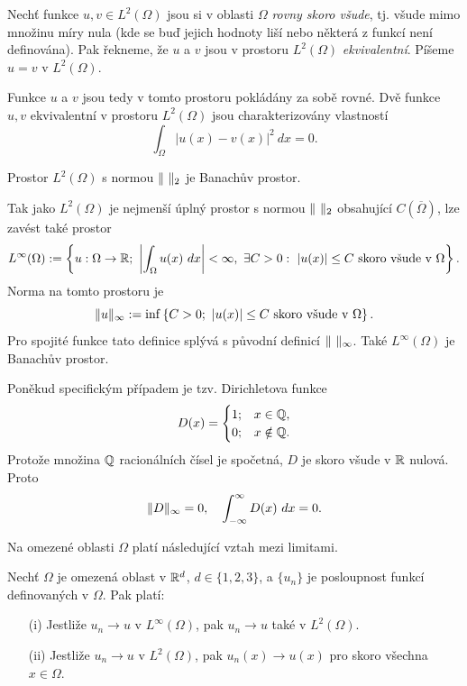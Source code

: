 \begin{df}
Nechť funkce $u,v\in L^2(\Omega)$ jsou si v oblasti $\Omega$ \emph{rovny skoro všude}, tj. všude mimo množinu míry nula (kde se buď jejich hodnoty liší nebo některá z funkcí není definována).
Pak řekneme, že $u$ a $v$ jsou v prostoru $L^2(\Omega)$ \emph{ekvivalentní}.
Píšeme $u=v$ v $L^2(\Omega)$.
\end{df}
Funkce $u$ a $v$ jsou tedy v tomto prostoru pokládány za sobě rovné.
Dvě funkce $u,v$ ekvivalentní v prostoru $L^2(\Omega)$ jsou charakterizovány vlastností
\[ \int_\Omega|u(x)-v(x)|^2~dx = 0. \]


\begin{veta}
Prostor $L^2(\Omega)$ s normou $\norm{\ }_2$ je Banachův prostor.
\end{veta}

Tak jako $L^2(\Omega)$ je nejmenší úplný prostor s normou $\norm{\ }_2$ obsahující $C(\overline\Omega)$, lze zavést také prostor
\[ L^\infty(\Omega):=\left\{u:\Omega\rightarrow\mathbb R;~\left|\int_\Omega u(x)~dx\right|<\infty, ~\exists C>0:~|u(x)|\le C \mbox{ skoro všude v }\Omega\right\}. \]
Norma na tomto prostoru je
\[ \|u\|_\infty := \inf\left\{C>0;~|u(x)|\le C \mbox{ skoro všude v }\Omega\right\}. \]
Pro spojité funkce tato definice splývá s původní definicí $\norm{\ }_\infty$.
Také $L^\infty(\Omega)$ je Banachův prostor.
\begin{ex}
Poněkud specifickým případem je tzv. Dirichletova funkce
\[ D(x) = \begin{cases}1;&x\in\mathbb Q,\\0;&x\notin\mathbb Q.\end{cases} \]
Protože množina $\mathbb Q$ racionálních čísel je spočetná, $D$ je skoro všude v $\mathbb R$ nulová. Proto
\[ \|D\|_\infty = 0,\quad \int_{-\infty}^\infty D(x)~dx=0. \]
\end{ex}

Na omezené oblasti $\Omega$ platí následující vztah mezi limitami.
\begin{veta}
Nechť $\Omega$ je omezená oblast v $\mathbb R^d$, $d\in\{1,2,3\}$, a $\{u_n\}$ je posloupnost funkcí definovaných v $\Omega$.
Pak platí:
\begin{itemize}
\item[(i)] Jestliže $u_n\to u$ v $L^\infty(\Omega)$, pak $u_n\to u$ také v $L^2(\Omega)$.
\item[(ii)] Jestliže $u_n\to u$ v $L^2(\Omega)$, pak $u_n(x)\to u(x)$ pro skoro všechna $x\in\Omega$.
\end{itemize}
\end{veta}






